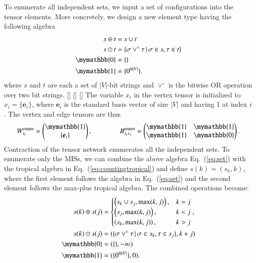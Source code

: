 \documentclass[onefignum, onetabnum]{siamart190516}
\newcommand{\<}{\langle}
\renewcommand{\>}{\rangle}
\newcommand{\Eq}[1]{Eq.~(\ref{#1})}
\newcommand{\red}[1]{[{\bf  \color{red}{ST: #1}}]}
\newcounter{example}
\begin{document}
To enumerate all independent sets, we input a set of configurations into the tensor elements. More concretely, we design a new element type having the following algebra
\begin{equation}
\begin{split}
    s \oplus t &= s \cup t\\
    s \odot t &= \{\sigma \lor^\circ \tau \, | \, \sigma \in s, \tau \in t\}\\
    \mymathbb{0} &= \{\}\\
    \mymathbb{1} &= \{0^{\otimes |V|}\}.
\end{split}\label{eq:set}
\end{equation}
where $s$ and $t$ are each a set of $|V|$-bit strings and $\lor^\circ$ is the bitwise OR operation over two bit strings. \red{This is the bitwise OR operation right? I can't seem to find online what you call Hadamard. Is there a definition somewhere?} \red{it would be useful to give an example of the operations above, $s = ... , t = ..., s \oplus t = ..., s \odot t = ...$.} \red{do we need to define $ \{\} \lor^\circ \sigma  = \sigma \lor^\circ \{\} = \{\}$?} The variable $x_{i}$ in the vertex tensor is initialized to $x_i = \{\boldsymbol{e}_{i}\}$, where $\boldsymbol{e}_i$ is the standard basis vector of size $|V|$ and having 1 at index $i$. The vertex and edge tensors are thus
\begin{equation}
    W_{s_i}^{\rm enum} = \left(\begin{matrix}
        \mymathbb{1} \\
        \{\boldsymbol{e}_{i}\}
    \end{matrix}\right),   
    \qquad \qquad
        B_{s_i s_j}^{\rm enum} = \left(\begin{matrix}
        \mymathbb{1}  & \mymathbb{1} \\
        \mymathbb{1} & \mymathbb{0}
    \end{matrix}\right).
\end{equation}
Contraction of the tensor network enumerates all the independent sets. To enumerate only the MISs, we can combine the above algebra \Eq{eq:set} with the tropical algebra in \Eq{eq:countingtropical} and define $s(k) = (s_{k}, k)$, where the first element follows the algebra in \Eq{eq:set} and the second element follows the max-plus tropical algebra. The combined operations become: 
\begin{equation}
\begin{split}
    s(k) \oplus s(j) &= \begin{cases}
        \left(s_k \cup s_j, \max(k,j) \right), & k = j \\
        \left(s_j, \max(k,j) \right), & k < j \\
        \left(s_k, \max(k,j) \right), & k > j
    \end{cases}, \\
    s(k) \odot s(j) &= (\{\sigma \lor^\circ \tau \, | \, \sigma \in s_k, \tau \in s_j\}, k+j) \\
    \mymathbb{0} &= (\{ \}, -\infty)\\
    \mymathbb{1} &= (\{0^{\otimes |V|}\}, 0). \label{eq:countingtropical}
\end{split}
\end{equation}
\end{document}
